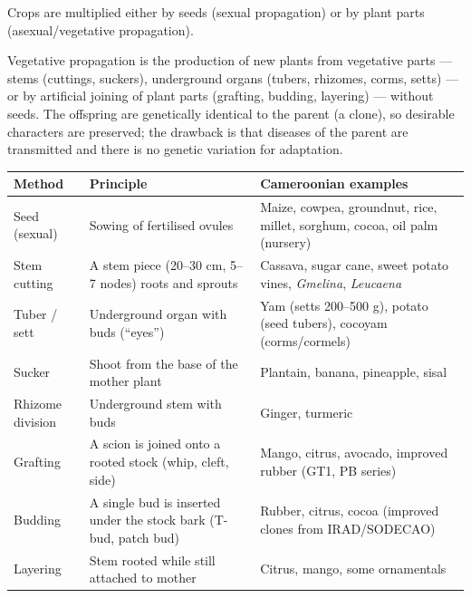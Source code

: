 \documentclass[11pt]{article}
\newcommand{\cle}[1]{{\popxbold\color{popdark}#1}}
\newcounter{popsec}
\newcounter{popsub}
\newcommand{\courssub}[1]{%
  \stepcounter{popsub}%
  \par\vspace{9pt}\noindent{\popxbold\fontsize{11.5}{13}\selectfont\color{popink}{\color{poporange}\thepopsec.\thepopsub}\hspace{6pt}#1}\par\nopagebreak\vspace{4pt}
}
\begin{document}
\courssub{Propagation Methods}

Crops are multiplied either by \cle{seeds} (sexual propagation) or by plant parts (asexual/vegetative propagation).

\begin{definition}
\cle{Vegetative propagation} is the production of new plants from vegetative parts — stems (cuttings, suckers), underground organs (tubers, rhizomes, corms, setts) — or by artificial joining of plant parts (grafting, budding, layering) — without seeds. The offspring are genetically identical to the parent (a clone), so desirable characters are preserved; the drawback is that diseases of the parent are transmitted and there is no genetic variation for adaptation.
\end{definition}

\begin{center}
\begin{tabularx}{\linewidth}{|l|X|X|}
\hline
\rowcolor{popblueL} \textbf{Method} & \textbf{Principle} & \textbf{Cameroonian examples} \\
\hline
Seed (sexual) & Sowing of fertilised ovules & Maize, cowpea, groundnut, rice, millet, sorghum, cocoa, oil palm (nursery) \\
\hline
Stem cutting & A stem piece (20--30 cm, 5--7 nodes) roots and sprouts & Cassava, sugar cane, sweet potato vines, \emph{Gmelina}, \emph{Leucaena} \\
\hline
Tuber / sett & Underground organ with buds (``eyes'') & Yam (setts 200--500 g), potato (seed tubers), cocoyam (corms/cormels) \\
\hline
Sucker & Shoot from the base of the mother plant & Plantain, banana, pineapple, sisal \\
\hline
Rhizome division & Underground stem with buds & Ginger, turmeric \\
\hline
Grafting & A scion is joined onto a rooted stock (whip, cleft, side) & Mango, citrus, avocado, improved rubber (GT1, PB series) \\
\hline
Budding & A single bud is inserted under the stock bark (T-bud, patch bud) & Rubber, citrus, cocoa (improved clones from IRAD/SODECAO) \\
\hline
Layering & Stem rooted while still attached to mother & Citrus, mango, some ornamentals \\
\hline
\end{tabularx}
\end{center}
\end{document}

